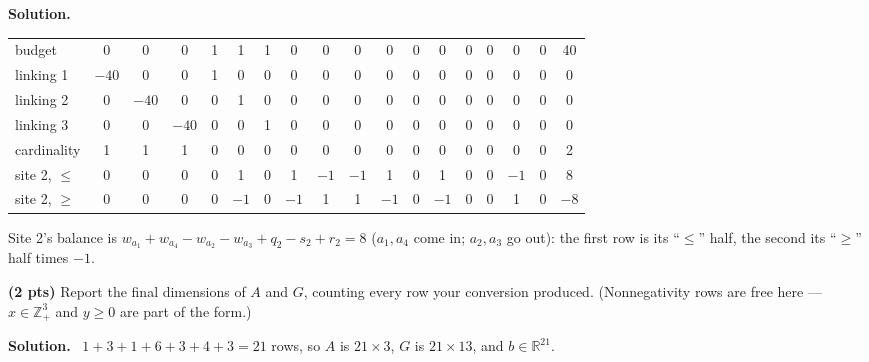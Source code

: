 \documentclass[10pt]{article}
\newenvironment{solution}
  {\par\smallskip\begingroup\color{solink}\textbf{Solution.}\ }
  {\endgroup\par}
\begin{document}
\begin{parts}
\begin{solution}
\begin{center}
\begin{tabular}{l|ccc|ccc|cccc|ccc|ccc|c}
 budget      & 0 & 0 & 0 & 1 & 1 & 1 & 0 & 0 & 0 & 0 & 0 & 0 & 0 & 0 & 0 & 0 & 40 \\
 linking 1   & $-40$ & 0 & 0 & 1 & 0 & 0 & 0 & 0 & 0 & 0 & 0 & 0 & 0 & 0 & 0 & 0 & 0 \\
 linking 2   & 0 & $-40$ & 0 & 0 & 1 & 0 & 0 & 0 & 0 & 0 & 0 & 0 & 0 & 0 & 0 & 0 & 0 \\
 linking 3   & 0 & 0 & $-40$ & 0 & 0 & 1 & 0 & 0 & 0 & 0 & 0 & 0 & 0 & 0 & 0 & 0 & 0 \\
 cardinality & 1 & 1 & 1 & 0 & 0 & 0 & 0 & 0 & 0 & 0 & 0 & 0 & 0 & 0 & 0 & 0 & 2 \\
 site 2, $\le$ & 0 & 0 & 0 & 0 & 1 & 0 & 1 & $-1$ & $-1$ & 1 & 0 & 1 & 0 & 0 & $-1$ & 0 & 8 \\
 site 2, $\ge$ & 0 & 0 & 0 & 0 & $-1$ & 0 & $-1$ & 1 & 1 & $-1$ & 0 & $-1$ & 0 & 0 & 1 & 0 & $-8$
\end{tabular}
\end{center}
Site 2's balance is $w_{a_1} + w_{a_4} - w_{a_2} - w_{a_3} + q_2 - s_2 + r_2 = 8$
($a_1, a_4$ come in; $a_2, a_3$ go out): the first row is its ``$\le$'' half, the
second its ``$\ge$'' half times $-1$.
\end{solution}

\item \textbf{(2 pts)} Report the final dimensions of $A$ and $G$, counting every
  row your conversion produced. (Nonnegativity rows are free here ---
  $x \in \mathbb{Z}^{3}_{+}$ and $y \ge 0$ are part of the form.)

\begin{solution}
$1 + 3 + 1 + 6 + 3 + 4 + 3 = 21$ rows, so $A$ is $21 \times 3$, $G$ is $21 \times 13$,
and $b \in \mathbb{R}^{21}$.
\end{solution}
\end{parts}
\end{document}
